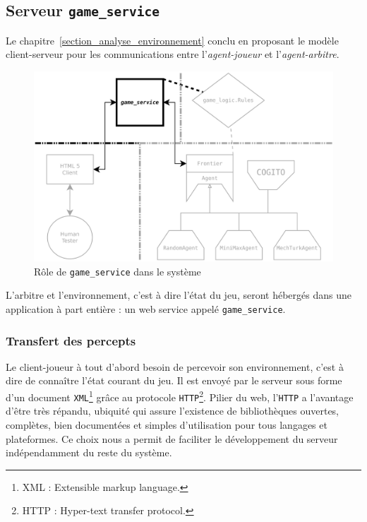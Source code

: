 \subsection{Serveur \texttt{game\_service}}
Le chapitre~\ref{section_analyse_environnement} conclu en proposant le modèle client-serveur pour les communications entre l'\emph{agent-joueur} et l'\emph{agent-arbitre}.

\begin{figure}[H] 
\centering
\includegraphics[width=\textwidth]{files/william/archi_serveur} 
\caption{Rôle de \texttt{game\_service} dans le système} 
\end{figure}

L'arbitre et l'environnement, c'est à dire l'état du jeu, seront hébergés dans une application à part entière : un \og web service \fg{} appelé \texttt{game\_service}.
\subsubsection{Transfert des percepts}
Le client-joueur à tout d'abord besoin de percevoir son environnement, c'est à dire de connaître l'état courant du jeu. Il est envoyé par le serveur sous forme d'un  document \texttt{XML}\footnote{ XML : Extensible markup language. } grâce au protocole \texttt{HTTP}\footnote{ HTTP : Hyper-text transfer  protocol. }. Pilier du web, l'\texttt{HTTP} a l'avantage d'être très  répandu, ubiquité qui assure l'existence de bibliothèques ouvertes,  complètes, bien documentées et simples d'utilisation pour tous langages et plateformes. Ce choix nous a permit de faciliter le développement du serveur indépendamment du reste du système.
